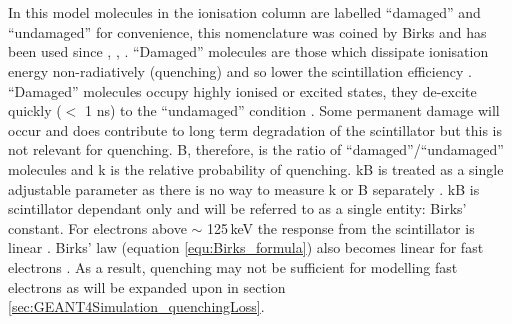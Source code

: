 \\\\In this model molecules in the ionisation column are labelled ``damaged'' and ``undamaged'' for convenience, this nomenclature was coined by Birks and has been used since \cite{birks_1964}, \cite{craun_1970}, \cite{knoll_2010}. ``Damaged'' molecules are those which dissipate ionisation energy non-radiatively (quenching) and so lower the scintillation efficiency\cite{craun_1970} \cite{knoll_2010}. ``Damaged'' molecules occupy highly ionised or excited states, they de-excite quickly ($<$ 1 ns) to the ``undamaged'' condition \cite{craun_1970}. Some permanent damage will occur and does contribute to long term degradation of the scintillator but this is not relevant for quenching\cite{craun_1970}. B, therefore, is the ratio of ``damaged''/``undamaged'' molecules and k is the relative probability of quenching. kB is treated as a single adjustable parameter as there is no way to measure k or B separately \cite{craun_1970} \cite{knoll_2010}. kB is scintillator dependant only and will be referred to as a single entity: Birks' constant. For electrons above $\sim$ 125\,keV the response from the scintillator is linear \cite{craun_1970}. Birks' law (equation \ref{equ:Birks_formula}) also becomes linear for fast electrons \cite{knoll_2010}. As a result, quenching may not be sufficient for modelling fast electrons as will be expanded upon in section \ref{sec:GEANT4Simulation_quenchingLoss}. 

